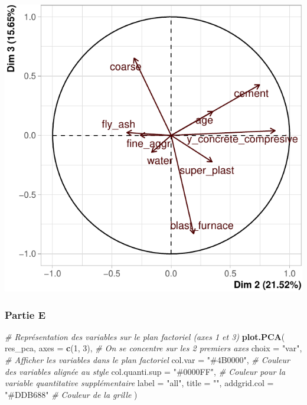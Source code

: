 \documentclass[
  12pt,
]{article}
\newenvironment{Shaded}{\begin{snugshade}}{\end{snugshade}}
\newcommand{\AttributeTok}[1]{\textcolor[rgb]{0.13,0.29,0.53}{#1}}
\newcommand{\CommentTok}[1]{\textcolor[rgb]{0.56,0.35,0.01}{\textit{#1}}}
\newcommand{\DecValTok}[1]{\textcolor[rgb]{0.00,0.00,0.81}{#1}}
\newcommand{\FunctionTok}[1]{\textcolor[rgb]{0.13,0.29,0.53}{\textbf{#1}}}
\newcommand{\NormalTok}[1]{#1}
\newcommand{\StringTok}[1]{\textcolor[rgb]{0.31,0.60,0.02}{#1}}
\begin{document}
\begin{center}\includegraphics{rmd_final_files/figure-latex/unnamed-chunk-30-1} \end{center}

\subsubsection{Partie E}\label{partie-e}

\begin{Shaded}
\begin{Highlighting}[]
\CommentTok{\# Représentation des variables sur le plan factoriel (axes 1 et 3)}
\FunctionTok{plot.PCA}\NormalTok{(}
\NormalTok{  res\_pca,}
  \AttributeTok{axes =} \FunctionTok{c}\NormalTok{(}\DecValTok{1}\NormalTok{, }\DecValTok{3}\NormalTok{),             }\CommentTok{\# On se concentre sur les 2 premiers axes}
  \AttributeTok{choix =} \StringTok{"var"}\NormalTok{,              }\CommentTok{\# Afficher les variables dans le plan factoriel}
  \AttributeTok{col.var =} \StringTok{"\#4B0000"}\NormalTok{,        }\CommentTok{\# Couleur des variables alignée au style}
  \AttributeTok{col.quanti.sup =} \StringTok{"\#0000FF"}\NormalTok{, }\CommentTok{\# Couleur pour la variable quantitative supplémentaire}
  \AttributeTok{label =} \StringTok{"all"}\NormalTok{,}
  \AttributeTok{title =} \StringTok{""}\NormalTok{,}
  \AttributeTok{addgrid.col =} \StringTok{"\#DDB688"}     \CommentTok{\# Couleur de la grille}
\NormalTok{)}
\end{Highlighting}
\end{Shaded}
\end{document}
